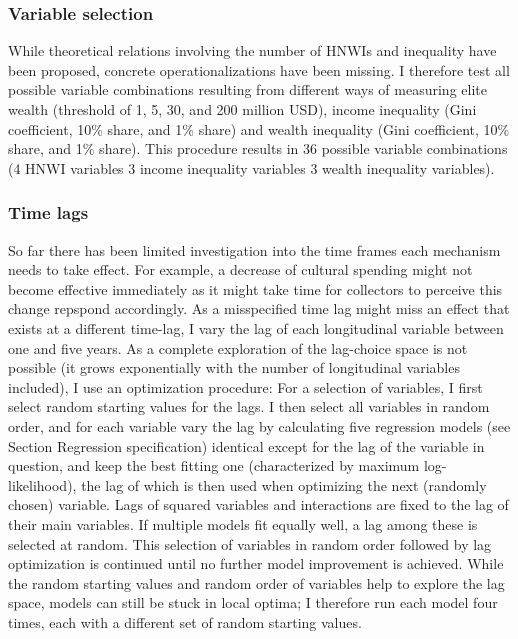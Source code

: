 \documentclass[11pt]{article}
\begin{document}
\subsubsection*{Variable selection}
\label{vrbl_slctn}
While theoretical relations involving the number of HNWIs and inequality have been proposed, concrete operationalizations have been missing.
I therefore test all possible variable combinations resulting from different ways of measuring elite wealth (threshold of 1, 5, 30, and 200 million USD), income inequality (Gini coefficient, 10\% share, and 1\% share) and wealth inequality (Gini coefficient, 10\% share, and 1\% share).
This procedure results in 36 possible variable combinations (4 HNWI variables \texttimes{} 3 income inequality variables \texttimes{} 3 wealth inequality variables). 


\subsubsection*{Time lags}

So far there has been limited investigation into the time frames each mechanism needs to take effect.
For example, a decrease of cultural spending might not become effective immediately as it might take time for collectors to perceive this change repspond accordingly.
As a misspecified time lag might miss an effect that exists at a different time-lag, I vary the lag of each longitudinal variable between one and five years.
As a complete exploration of the lag-choice space is not possible (it grows exponentially with the number of longitudinal variables included), I use an optimization procedure:
For a selection of variables, I first select random starting values for the lags.
I then select all variables in random order, and for each variable vary the lag by calculating five regression models (see Section Regression specification) identical except for the lag of the variable in question, and keep the best fitting one (characterized by maximum log-likelihood), the lag of which is then used when optimizing the next (randomly chosen) variable.
Lags of squared variables and interactions are fixed to the lag of their main variables.
If multiple models fit equally well, a lag among these is selected at random.
This selection of variables in random order followed by lag optimization is continued until no further model improvement is achieved.
While the random starting values and random order of variables help to explore the lag space, models can still be stuck in local optima; I therefore run each model four times, each with a different set of random starting values. 
\end{document}
